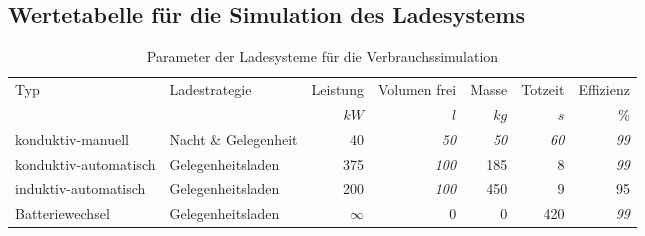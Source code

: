 \subsection{Wertetabelle für die Simulation des Ladesystems}
\begin{table}[h] \centering
	\begin{tabulary}{\linewidth}{LlRRRRR}
		\toprule
		Typ                   & Ladestrategie        & Leistung & Volumen frei &     Masse &   Totzeit & Effizienz \\
		                      &                      &     $kW$ &          $l$ &      $kg$ &       $s$ &        \% \\ \midrule
		konduktiv-manuell     & Nacht \& Gelegenheit &       40 &    \emph{50} & \emph{50} & \emph{60} & \emph{99} \\
		konduktiv-automatisch & Gelegenheitsladen    &      375 &   \emph{100} &       185 &         8 & \emph{99} \\
		induktiv-automatisch  & Gelegenheitsladen    &      200 &   \emph{100} &       450 &         9 &        95 \\
		Batteriewechsel       & Gelegenheitsladen    & $\infty$ &            0 &         0 &       420 & \emph{99} \\ \bottomrule
	\end{tabulary}
	\caption{Parameter der Ladesysteme für die Verbrauchssimulation}
	\label{tab_parameterLadesysSimFzg}
\end{table}


